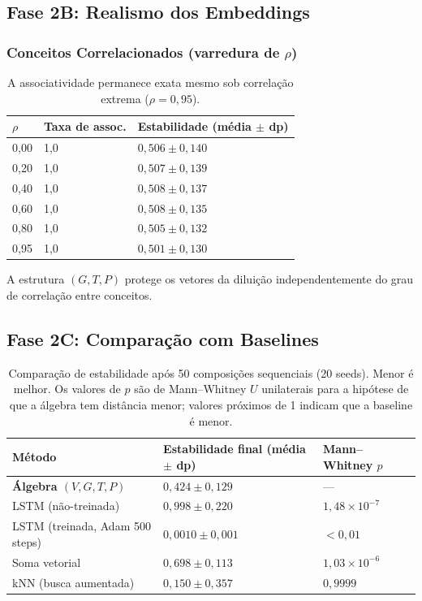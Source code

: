 \documentclass[11pt,a4paper]{article}
\theoremstyle{definition}
\begin{document}
\subsection{Fase 2B: Realismo dos Embeddings}

\subsubsection{Conceitos Correlacionados (varredura de $\rho$)}

\begin{table}[h]
\centering
\begin{tabular}{lll}
\toprule
$\rho$ & Taxa de assoc. & Estabilidade (m\'edia $\pm$ dp) \\
\midrule
0,00 & 1,0 & $0{,}506 \pm 0{,}140$ \\
0,20 & 1,0 & $0{,}507 \pm 0{,}139$ \\
0,40 & 1,0 & $0{,}508 \pm 0{,}137$ \\
0,60 & 1,0 & $0{,}508 \pm 0{,}135$ \\
0,80 & 1,0 & $0{,}505 \pm 0{,}132$ \\
0,95 & 1,0 & $0{,}501 \pm 0{,}130$ \\
\bottomrule
\end{tabular}
\caption{A associatividade permanece exata mesmo sob correla\c{c}\~ao extrema ($\rho = 0{,}95$).}
\end{table}

A estrutura $(G, T, P)$ protege os vetores da dilui\c{c}\~ao independentemente do grau de correla\c{c}\~ao entre conceitos.

\subsection{Fase 2C: Compara\c{c}\~ao com Baselines}

\begin{table}[h]
\centering
\begin{tabular}{lll}
\toprule
\textbf{M\'etodo} & \textbf{Estabilidade final (m\'edia $\pm$ dp)} & \textbf{Mann--Whitney $p$} \\
\midrule
\textbf{\'Algebra $(V,G,T,P)$} & $0{,}424 \pm 0{,}129$ & --- \\
LSTM (n\~ao-treinada) & $0{,}998 \pm 0{,}220$ & $1{,}48 \times 10^{-7}$ \\
LSTM (treinada, Adam 500 steps) & $0{,}0010 \pm 0{,}001$ & $< 0{,}01$ \\
Soma vetorial & $0{,}698 \pm 0{,}113$ & $1{,}03 \times 10^{-6}$ \\
kNN (busca aumentada) & $0{,}150 \pm 0{,}357$ & $0{,}9999$ \\
\bottomrule
\end{tabular}
\caption{Compara\c{c}\~ao de estabilidade ap\'os 50 composi\c{c}\~oes sequenciais (20 seeds). Menor \'e melhor. Os valores de $p$ s\~ao de Mann--Whitney $U$ unilaterais para a hip\'otese de que a \'algebra tem dist\^ancia menor; valores pr\'oximos de 1 indicam que a baseline \'e menor.}
\end{table}
\end{document}
